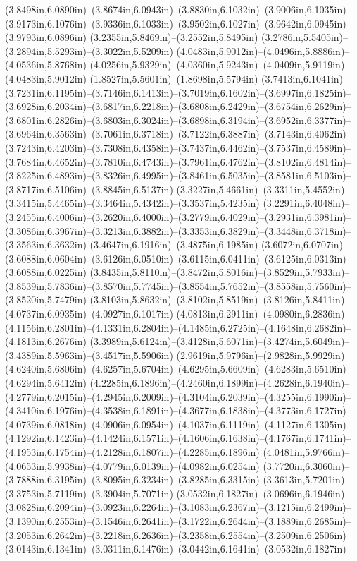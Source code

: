 (3.8498in,6.0890in)--(3.8674in,6.0943in)--(3.8830in,6.1032in)--(3.9006in,6.1035in)--(3.9173in,6.1076in)--(3.9336in,6.1033in)--(3.9502in,6.1027in)--(3.9642in,6.0945in)--(3.9793in,6.0896in) (3.2355in,5.8469in)--(3.2552in,5.8495in) (3.2786in,5.5405in)--(3.2894in,5.5293in)--(3.3022in,5.5209in) (4.0483in,5.9012in)--(4.0496in,5.8886in)--(4.0536in,5.8768in) (4.0256in,5.9329in)--(4.0360in,5.9243in)--(4.0409in,5.9119in)--(4.0483in,5.9012in) (1.8527in,5.5601in)--(1.8698in,5.5794in) (3.7413in,6.1041in)--(3.7231in,6.1195in)--(3.7146in,6.1413in)--(3.7019in,6.1602in)--(3.6997in,6.1825in)--(3.6928in,6.2034in)--(3.6817in,6.2218in)--(3.6808in,6.2429in)--(3.6754in,6.2629in)--(3.6801in,6.2826in)--(3.6803in,6.3024in)--(3.6898in,6.3194in)--(3.6952in,6.3377in)--(3.6964in,6.3563in)--(3.7061in,6.3718in)--(3.7122in,6.3887in)--(3.7143in,6.4062in)--(3.7243in,6.4203in)--(3.7308in,6.4358in)--(3.7437in,6.4462in)--(3.7537in,6.4589in)--(3.7684in,6.4652in)--(3.7810in,6.4743in)--(3.7961in,6.4762in)--(3.8102in,6.4814in)--(3.8225in,6.4893in)--(3.8326in,6.4995in)--(3.8461in,6.5035in)--(3.8581in,6.5103in)--(3.8717in,6.5106in)--(3.8845in,6.5137in) (3.3227in,5.4661in)--(3.3311in,5.4552in)--(3.3415in,5.4465in)--(3.3464in,5.4342in)--(3.3537in,5.4235in) (3.2291in,6.4048in)--(3.2455in,6.4006in)--(3.2620in,6.4000in)--(3.2779in,6.4029in)--(3.2931in,6.3981in)--(3.3086in,6.3967in)--(3.3213in,6.3882in)--(3.3353in,6.3829in)--(3.3448in,6.3718in)--(3.3563in,6.3632in) (3.4647in,6.1916in)--(3.4875in,6.1985in) (3.6072in,6.0707in)--(3.6088in,6.0604in)--(3.6126in,6.0510in)--(3.6115in,6.0411in)--(3.6125in,6.0313in)--(3.6088in,6.0225in) (3.8435in,5.8110in)--(3.8472in,5.8016in)--(3.8529in,5.7933in)--(3.8539in,5.7836in)--(3.8570in,5.7745in)--(3.8554in,5.7652in)--(3.8558in,5.7560in)--(3.8520in,5.7479in) (3.8103in,5.8632in)--(3.8102in,5.8519in)--(3.8126in,5.8411in) (4.0737in,6.0935in)--(4.0927in,6.1017in) (4.0813in,6.2911in)--(4.0980in,6.2836in)--(4.1156in,6.2801in)--(4.1331in,6.2804in)--(4.1485in,6.2725in)--(4.1648in,6.2682in)--(4.1813in,6.2676in) (3.3989in,5.6124in)--(3.4128in,5.6071in)--(3.4274in,5.6049in)--(3.4389in,5.5963in)--(3.4517in,5.5906in) (2.9619in,5.9796in)--(2.9828in,5.9929in) (4.6240in,5.6806in)--(4.6257in,5.6704in)--(4.6295in,5.6609in)--(4.6283in,5.6510in)--(4.6294in,5.6412in) (4.2285in,6.1896in)--(4.2460in,6.1899in)--(4.2628in,6.1940in)--(4.2779in,6.2015in)--(4.2945in,6.2009in)--(4.3104in,6.2039in)--(4.3255in,6.1990in)--(4.3410in,6.1976in)--(4.3538in,6.1891in)--(4.3677in,6.1838in)--(4.3773in,6.1727in) (4.0739in,6.0818in)--(4.0906in,6.0954in)--(4.1037in,6.1119in)--(4.1127in,6.1305in)--(4.1292in,6.1423in)--(4.1424in,6.1571in)--(4.1606in,6.1638in)--(4.1767in,6.1741in)--(4.1953in,6.1754in)--(4.2128in,6.1807in)--(4.2285in,6.1896in) (4.0481in,5.9766in)--(4.0653in,5.9938in)--(4.0779in,6.0139in)--(4.0982in,6.0254in) (3.7720in,6.3060in)--(3.7888in,6.3195in)--(3.8095in,6.3234in)--(3.8285in,6.3315in) (3.3613in,5.7201in)--(3.3753in,5.7119in)--(3.3904in,5.7071in) (3.0532in,6.1827in)--(3.0696in,6.1946in)--(3.0828in,6.2094in)--(3.0923in,6.2264in)--(3.1083in,6.2367in)--(3.1215in,6.2499in)--(3.1390in,6.2553in)--(3.1546in,6.2641in)--(3.1722in,6.2644in)--(3.1889in,6.2685in)--(3.2053in,6.2642in)--(3.2218in,6.2636in)--(3.2358in,6.2554in)--(3.2509in,6.2506in) (3.0143in,6.1341in)--(3.0311in,6.1476in)--(3.0442in,6.1641in)--(3.0532in,6.1827in) 